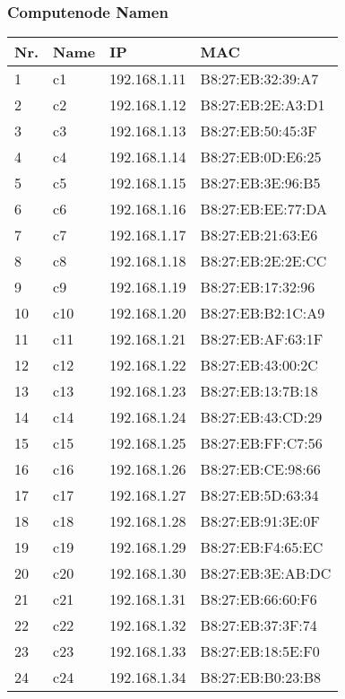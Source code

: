 \subsubsection{Computenode Namen}
\begin{table}[H]
\centering
\begin{tabular}{p{1cm}p{2cm}p{6cm}p{6cm}}
\hline
\rowcolor{heading} \textbf{Nr.} & \textbf{Name} & \textbf{IP} & \textbf{MAC} \\\hline
1 & c1 & 192.168.1.11 & B8:27:EB:32:39:A7\\\hline
2 & c2 & 192.168.1.12 & B8:27:EB:2E:A3:D1\\\hline
3 & c3 & 192.168.1.13 & B8:27:EB:50:45:3F\\\hline
4 & c4 & 192.168.1.14 & B8:27:EB:0D:E6:25\\\hline
5 & c5 & 192.168.1.15 & B8:27:EB:3E:96:B5\\\hline
6 & c6 & 192.168.1.16 & B8:27:EB:EE:77:DA\\\hline
7 & c7 & 192.168.1.17 & B8:27:EB:21:63:E6\\\hline
8 & c8 & 192.168.1.18 & B8:27:EB:2E:2E:CC\\\hline
9 & c9 & 192.168.1.19 & B8:27:EB:17:32:96\\\hline
10 & c10 & 192.168.1.20 & B8:27:EB:B2:1C:A9\\\hline
11 & c11 & 192.168.1.21 & B8:27:EB:AF:63:1F\\\hline
12 & c12 & 192.168.1.22 & B8:27:EB:43:00:2C\\\hline
13 & c13 & 192.168.1.23 & B8:27:EB:13:7B:18\\\hline
14 & c14 & 192.168.1.24 & B8:27:EB:43:CD:29\\\hline
15 & c15 & 192.168.1.25 & B8:27:EB:FF:C7:56\\\hline
16 & c16 & 192.168.1.26 & B8:27:EB:CE:98:66\\\hline
17 & c17 & 192.168.1.27 & B8:27:EB:5D:63:34\\\hline
18 & c18 & 192.168.1.28 & B8:27:EB:91:3E:0F\\\hline
19 & c19 & 192.168.1.29 & B8:27:EB:F4:65:EC\\\hline
20 & c20 & 192.168.1.30 & B8:27:EB:3E:AB:DC\\\hline
21 & c21 & 192.168.1.31 & B8:27:EB:66:60:F6\\\hline
22 & c22 & 192.168.1.32 & B8:27:EB:37:3F:74\\\hline
23 & c23 & 192.168.1.33 & B8:27:EB:18:5E:F0\\\hline
24 & c24 & 192.168.1.34 & B8:27:EB:B0:23:B8\\\hline

\end{tabular}
\end{table}
